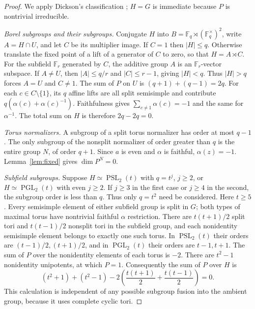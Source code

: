 \documentclass[11pt]{article}
\theoremstyle{remark}\newtheorem{remark}[theorem]{Remark}
\newcommand{\PSL}{\operatorname{PSL}}
\newcommand{\PGL}{\operatorname{PGL}}
\newcommand{\F}{\mathbb F}
\begin{document}
\begin{proof}
We apply Dickson's classification \cite[Theorem A.1]{GZ}; $H=G$ is
immediate because $P$ is nontrivial irreducible.

\emph{Borel subgroups and their subgroups.}
Conjugate $H$ into $B=\F_q\rtimes(\F_q^\times)^2$, write
$A=H\cap U$, and let $C$ be its multiplier image.
If $C=1$ then $|H|\le q$. Otherwise translate the fixed point of a lift
of a generator of $C$ to zero, so that $H=A\rtimes C$.
For the subfield $\F_r$ generated by $C$, the additive group $A$ is an
$\F_r$-vector subspace. If $A\ne U$, then
$|A|\le q/r$ and $|C|\le r-1$, giving $|H|<q$.
Thus $|H|>q$ forces $A=U$ and $C\ne1$.
The sum of $P$ on $U$ is $(q+1)+(q-1)=2q$.
For each $c\in C\setminus\{1\}$, its $q$ affine lifts are all split
semisimple and contribute $q(\alpha(c)+\alpha(c)^{-1})$.
Faithfulness gives $\sum_{c\ne1}\alpha(c)=-1$ and the same for
$\alpha^{-1}$. The total sum on $H$ is therefore $2q-2q=0$.

\emph{Torus normalizers.}
A subgroup of a split torus normalizer has order at most $q-1$.
The only subgroup of the nonsplit normalizer of order greater than $q$
is the entire group $N$, of order $q+1$.
Since $a$ is even and $\alpha$ is faithful, $\alpha(z)=-1$.
Lemma~\ref{lem:fixed} gives $\dim P^N=0$.

\emph{Subfield subgroups.}
Suppose $H\simeq\PSL_2(t)$ with $q=t^j$, $j\ge2$, or
$H\simeq\PGL_2(t)$ with even $j\ge2$.
If $j\ge3$ in the first case or $j\ge4$ in the second, the subgroup
order is less than $q$. Thus only $q=t^2$ need be considered.
Here $t\ge5$. Every semisimple element of either subfield group is split
in $G$; both types of maximal torus have nontrivial faithful $\alpha$
restriction. There are $t(t+1)/2$ split tori and $t(t-1)/2$ nonsplit tori
in the subfield group, and each nonidentity semisimple element belongs
to exactly one such torus. In $\PSL_2(t)$ their orders are
$(t-1)/2,(t+1)/2$, and in $\PGL_2(t)$ their orders are $t-1,t+1$.
The sum of $P$ over the nonidentity elements of each torus is $-2$.
There are $t^2-1$ nonidentity unipotents, at which $P=1$.
Consequently the sum of $P$ over $H$ is
\[
 (t^2+1)+(t^2-1)-2\left(\frac{t(t+1)}2+
                                 \frac{t(t-1)}2\right)=0.
\]
This calculation is independent of any possible subgroup fusion into
the ambient group, because it uses complete cyclic tori.


\end{proof}
\end{document}
